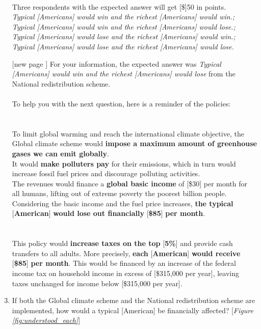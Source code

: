 \begin{enumerate}[resume]
\\
Three respondents with the expected answer will get [\$]50 in points.
\\ \textit{Typical [Americans] would win and the richest [Americans] would win.; Typical [Americans] would win and the richest [Americans] would lose.; Typical [Americans] would lose and the richest [Americans] would win.; Typical [Americans] would lose and the richest [Americans] would lose.}
\item[[new page\!\!\!]] For your information, the expected answer was \textit{Typical [Americans] would win and the richest [Americans] would lose} from the National redistribution scheme. \\ 
\\
To help you with the next question, here is a reminder of the policies:\\
\\
\textbf{}\\ 
To limit global warming and reach the international climate objective, the Global climate scheme would \textbf{impose a maximum amount of greenhouse gases we can emit globally}.\\
It would \textbf{make polluters pay} for their emissions, which in turn would increase fossil fuel prices and discourage polluting activities.\\
The revenues would finance a \textbf{global basic income} of [\$30] per month for all humans, lifting out of extreme poverty the poorest billion people.\\
Considering the basic income and the fuel price increases, \textbf{the typical }[\textbf{American}]\textbf{ would lose out financially }[\textbf{\$85}]\textbf{ per month}.\\
\\
\textbf{} \\This policy would \textbf{increase taxes on the top }[\textbf{5\%}] and provide cash transfers to all adults. More precisely, \textbf{each }[\textbf{American}]\textbf{ would receive }[\textbf{\$85}]\textbf{ per month}. This would be financed by an increase of the federal income tax on household income in excess of [\$315,000 per year], leaving taxes unchanged for income below [\$315,000 per year].
\item \label{q:understood_both} If both the Global climate scheme and the National redistribution scheme are implemented, how would a typical [American] be financially affected? [\textit{Figure \ref{fig:understood_each}}] \\

\end{enumerate}
